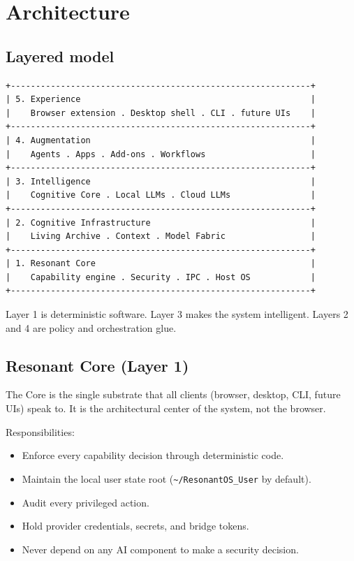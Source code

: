 
\chapter{Architecture}

\section{Layered model}

\begin{verbatim}
+------------------------------------------------------------+
| 5. Experience                                              |
|    Browser extension . Desktop shell . CLI . future UIs    |
+------------------------------------------------------------+
| 4. Augmentation                                            |
|    Agents . Apps . Add-ons . Workflows                     |
+------------------------------------------------------------+
| 3. Intelligence                                            |
|    Cognitive Core . Local LLMs . Cloud LLMs                |
+------------------------------------------------------------+
| 2. Cognitive Infrastructure                                |
|    Living Archive . Context . Model Fabric                 |
+------------------------------------------------------------+
| 1. Resonant Core                                           |
|    Capability engine . Security . IPC . Host OS            |
+------------------------------------------------------------+
\end{verbatim}

Layer 1 is deterministic software. Layer 3 makes the system
intelligent. Layers 2 and 4 are policy and orchestration glue.

\section{Resonant Core (Layer 1)}

The Core is the single substrate that all clients (browser, desktop,
CLI, future UIs) speak to. It is the architectural center of the
system, not the browser.

Responsibilities:
\begin{itemize}
  \item Enforce every capability decision through deterministic code.
  \item Maintain the local user state root (\texttt{\textasciitilde/ResonantOS\_User} by default).
  \item Audit every privileged action.
  \item Hold provider credentials, secrets, and bridge tokens.
  \item Never depend on any AI component to make a security decision.
\end{itemize}

